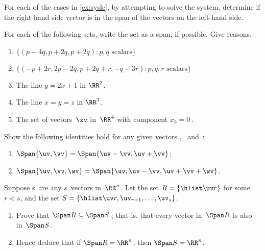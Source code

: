 \begin{exercise}  
For each of the cases in \autoref{ex:syslc}, by attempting to solve the system, determine if the right-hand side vector is in the span of the vectors on the left-hand side.
\end{exercise}




\begin{exercise}  
For each of the following sets, write the set as a span, if possible.
Give reasons.
\begin{enumerate}
\item \(\{(p-4q,p+2q,p+2q): p,q\text{ scalars}\}\)

\item \(\{(-p+2r,2p-2q,p+2q+r,-q-3r): p,q,r\text{ scalars}\}\)

\item The line \(y=2x+1\) in \(\RR^2\).

\item The line \(x=y=z\) in \(\RR^3\).

\item The set of vectors~\(\xv\) in~\(\RR^4\) with component \(x_3=0\)\,.
\end{enumerate}
\end{exercise}







\begin{exercise}  
Show the following identities hold for any given vectors \uv, \vv\ and~\wv:
\begin{enumerate}
\item \(\Span\{\uv,\vv\}=\Span\{\uv-\vv,\uv+\vv\}\);
\item \(\Span\{\uv,\vv,\wv\}=\Span\{\uv,\uv-\vv,\uv+\vv+\wv\}\).
\end{enumerate}
\end{exercise}








\begin{exercise}  
Suppose \hlist\uv s\ are any \(s\)~vectors in~\(\RR^n\).
Let the set \(R=\{\hlist\uv r\}\) for some \(r<s\), and the set \(S=\{\hlist\uv r,\uv_{r+1},\ldots,\uv_s\}\).
\begin{enumerate}
\item Prove that \(\Span R\subseteq\Span S\)\,; that is, that every vector in~\(\Span R\) is also in~\(\Span S\).
\item Hence deduce that if \(\Span R=\RR^n\), then \(\Span S=\RR^n\).
\end{enumerate}
\end{exercise}




